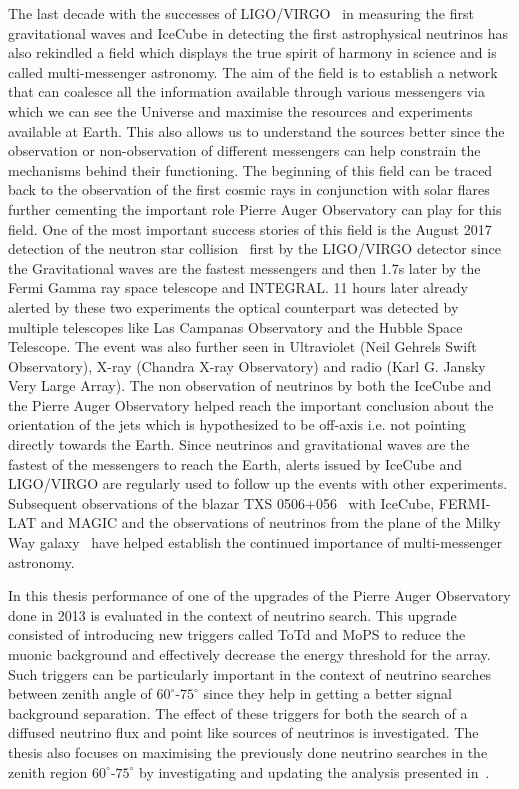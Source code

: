 The last decade with the successes of LIGO/VIRGO~\cite{PhysRevLett.116.061102} in measuring the first gravitational waves and IceCube in detecting the first astrophysical neutrinos has also rekindled a field which displays the true spirit of harmony in science and is called multi-messenger astronomy. The aim of the field is to establish a network that can coalesce all the information available through various messengers via which we can see the Universe and maximise the resources and experiments available at Earth. This also allows us to understand the sources better since the observation or non-observation of different messengers can help constrain the mechanisms behind their functioning. The beginning of this field can be traced back to the observation of the first cosmic rays in conjunction with solar flares further cementing the important role Pierre Auger Observatory can play for this field. One of the most important success stories of this field is the August 2017 detection of the neutron star collision~\cite{Abbott_2017} first by the LIGO/VIRGO detector since the Gravitational waves are the fastest messengers and then 1.7s later by the Fermi Gamma ray space telescope and INTEGRAL. 11 hours later already alerted by these two experiments the optical counterpart was detected by multiple telescopes like Las Campanas Observatory and the Hubble Space Telescope. The event was also further seen in Ultraviolet (Neil Gehrels Swift Observatory), X-ray (Chandra X-ray Observatory) and radio (Karl G. Jansky Very Large Array). The non observation of neutrinos by both the IceCube and the Pierre Auger Observatory helped reach the important conclusion about the orientation of the jets which is hypothesized to be off-axis i.e. not pointing directly towards the Earth. Since neutrinos and gravitational waves are the fastest of the messengers to reach the Earth, alerts issued by IceCube and LIGO/VIRGO are regularly used to follow up the events with other experiments. Subsequent observations of the blazar TXS 0506+056~\cite{TXS_Multi_2018} with IceCube, FERMI-LAT and MAGIC and the observations of neutrinos from the plane of the Milky Way galaxy~\cite{Galactic_plane_nu_2023} have helped establish the continued importance of multi-messenger astronomy.

In this thesis performance of one of the upgrades of the Pierre Auger Observatory done in 2013 is evaluated in the context of neutrino search. This upgrade consisted of introducing new triggers called \gls{ToTd} and \gls{MoPS} to reduce the muonic background and effectively decrease the energy threshold for the array. Such triggers can be particularly important in the context of neutrino searches between zenith angle of $60^\circ$-$75^\circ$ since they help in getting a better signal background separation. The effect of these triggers for both the search of a diffused neutrino flux and point like sources of neutrinos is investigated. The thesis also focuses on maximising the previously done neutrino searches in the zenith region $60^\circ$-$75^\circ$ by investigating and updating the analysis presented in~\cite{Aab_2019_diffuse, gap_note_2013}.

